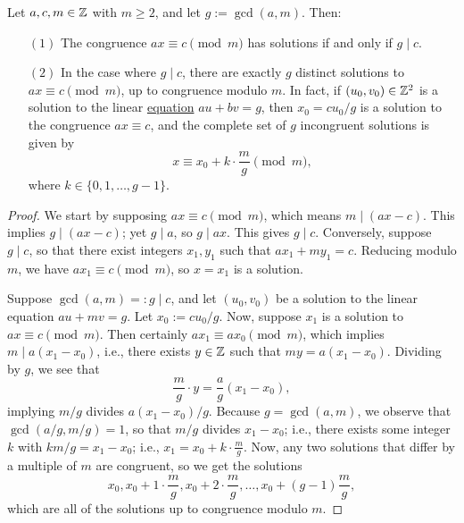 \documentclass{article}
\begin{document}
\begin{theorem}
Let $a,c,m\in \mathbb Z$ with $m\geq 2$, and let $g := \gcd(a, m)$. Then:
\begin{itemize}
    \item[$(1)$] The congruence $ax\equiv c\pmod m$ has solutions if and only if $g\mid c$.
    \item[$(2)$] In the case where $g\mid c$, there are exactly $g$ distinct solutions to $ax \equiv c\pmod m$, up to congruence modulo $m$. In fact, if $(u_0, v_0)\in\mathbb Z^2$ is a solution to the linear \underline{equation} $au + bv = g$, then $x_0 = cu_0/g$ is a solution to the congruence $ax \equiv c$, and the complete set of $g$ incongruent solutions is given by
    $$x \equiv x_0 + k \cdot \frac mg \pmod m,$$
    where $k \in \{0, 1,\ldots, g-1\}$.
\end{itemize}
\end{theorem}
\begin{proof}
We start by supposing $ax\equiv c\pmod m$, which means $m\mid (ax-c)$. This implies $g \mid (ax-c)$; yet $g\mid a$, so $g\mid ax$. This gives $g\mid c$. Conversely, suppose $g\mid c$, so that there exist integers $x_1, y_1$ such that $ax_1+my_1= c$. Reducing modulo $m$, we have $ax_1 \equiv c\pmod m$, so $x = x_1$ is a solution.

Suppose $\gcd(a, m) =: g\mid c$, and let $(u_0, v_0)$ be a solution to the linear equation $au + mv = g$. Let $x_0 := cu_0/g$. Now, suppose $x_1$ is a solution to $ax\equiv c\pmod m$. Then certainly $ax_1\equiv ax_0 \pmod m$, which implies $m\mid a(x_1-x_0)$, i.e., there exists $y\in\mathbb Z$ such that $my = a(x_1-x_0)$. Dividing by $g$, we see that
$$\frac mg\cdot y = \frac ag (x_1-x_0),$$
implying $m/g$ divides $a(x_1-x_0)/g$. Because $g = \gcd(a,m)$, we observe that $\gcd(a/g, m/g) = 1$, so that $m/g$ divides $x_1-x_0$; i.e., there exists some integer $k$ with $km/g = x_1-x_0$; i.e., $x_1 = x_0 + k \cdot \frac mg$. Now, any two solutions that differ by a multiple of $m$ are congruent, so we get the solutions
$$x_0, x_0 + 1\cdot \frac mg, x_0 + 2\cdot \frac mg, \ldots, x_0 + (g-1)\frac {m}g,$$
which are all of the solutions up to congruence modulo $m$.
\end{proof}

\setcounter{section}{47}
\end{document}
